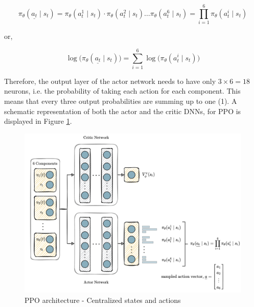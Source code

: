 \begin{equation}
    \pi_{\theta}(\underline{a_t} \mid s_t) = \pi_{\theta}(a_t^1 \mid s_t) \cdot \pi_{\theta}(a_t^2 \mid s_t)\ldots \pi_{\theta}(a_t^6 \mid s_t) = \prod _{i=1}^6\pi_{\theta}(a_t^i \mid s_t)
\end{equation}

or,

\begin{equation}
    \log \big( \pi_{\theta}(\underline{a_t} \mid s_t) \big) = \sum _{i=1}^6 \log \big( \pi_{\theta}(a_t^i \mid s_t) \big)
\end{equation}



Therefore, the output layer of the actor network needs to have only $3 \times 6 = 18$ neurons, i.e. the probability of taking each action for each component. This means that every three output probabilities are summing up to one (1). A schematic representation of both the actor and the critic \glspl{DNN}, for \gls{PPO} \footnotemark is displayed in Figure \ref{casePPOnet}.\\



\begin{figure}[H]
    \centering
    \includegraphics[width=\textwidth]{Figures/casePPOnet.png}
	\caption{\gls{PPO} architecture - Centralized states and actions}
	\label{casePPOnet}
\end{figure}

